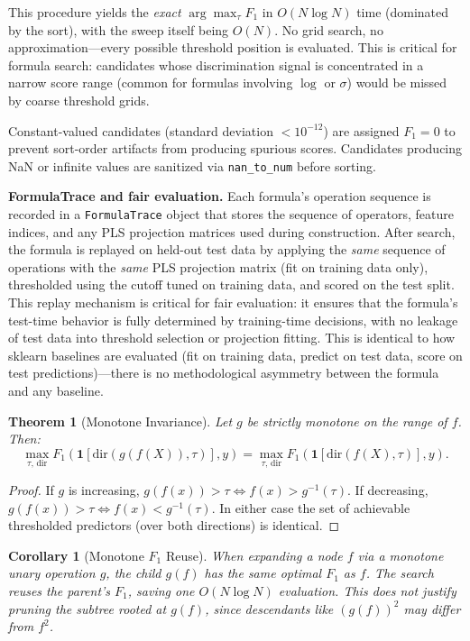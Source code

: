 \documentclass[journal]{IEEEtran}
\newtheorem{theorem}{Theorem}
\newtheorem{corollary}{Corollary}
\begin{document}
This procedure yields the \emph{exact} $\arg\max_\tau F_1$ in
$O(N \log N)$ time (dominated by the sort), with the sweep itself
being $O(N)$.  No grid search, no approximation---every possible
threshold position is evaluated.  This is critical for formula
search: candidates whose discrimination signal is concentrated in
a narrow score range (common for formulas involving $\log$ or
$\sigma$) would be missed by coarse threshold grids.

Constant-valued candidates (standard deviation $< 10^{-12}$) are
assigned $F_1 = 0$ to prevent sort-order artifacts from producing
spurious scores.  Candidates producing NaN or infinite values are
sanitized via \texttt{nan\_to\_num} before sorting.

\textbf{FormulaTrace and fair evaluation.}
Each formula's operation sequence is recorded in a
\texttt{FormulaTrace} object that stores the sequence of operators,
feature indices, and any PLS projection matrices used during
construction.  After search, the formula is replayed on held-out
test data by applying the \emph{same} sequence of operations with
the \emph{same} PLS projection matrix (fit on training data only),
thresholded using the cutoff tuned on training data, and scored on
the test split.  This replay mechanism is critical for fair
evaluation: it ensures that the formula's test-time behavior is
fully determined by training-time decisions, with no leakage of
test data into threshold selection or projection fitting.  This is
identical to how sklearn baselines are evaluated (fit on training
data, predict on test data, score on test predictions)---there is
no methodological asymmetry between the formula and any baseline.

\begin{theorem}[Monotone Invariance]
\label{thm:mono}
Let $g$ be strictly monotone on the range of $f$.  Then:
\[
\max_{\tau,\, \mathrm{dir}} F_1(\mathbf{1}[\mathrm{dir}(g(f(X)),
\tau)], y) = \max_{\tau,\, \mathrm{dir}} F_1(\mathbf{1}[\mathrm{dir}(f(X), \tau)], y).
\]
\end{theorem}

\begin{proof}
If $g$ is increasing, $g(f(x)) > \tau \Leftrightarrow f(x) >
g^{-1}(\tau)$.  If decreasing, $g(f(x)) > \tau \Leftrightarrow
f(x) < g^{-1}(\tau)$.  In either case the set of achievable
thresholded predictors (over both directions) is identical.
\end{proof}

\begin{corollary}[Monotone $F_1$ Reuse]
When expanding a node $f$ via a monotone unary operation $g$,
the child $g(f)$ has the same optimal $F_1$ as $f$.  The search
reuses the parent's $F_1$, saving one $O(N \log N)$ evaluation.
This does \emph{not} justify pruning the subtree rooted at
$g(f)$, since descendants like $(g(f))^2$ may differ from $f^2$.
\end{corollary}
\end{document}
